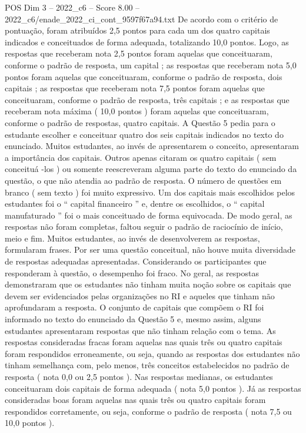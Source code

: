 \begin{textsample}{POS Dim 3 – 2022\_c6 – Score 8.00 – 2022\_c6/enade\_2022\_ci\_cont\_9597f67a94.txt}
De acordo com o critério de pontuação, foram atribuídos 2,5 pontos para cada um dos quatro capitais indicados e conceituados de forma adequada, totalizando 10,0 pontos.
Logo, as respostas que receberam nota 2,5 pontos foram aquelas que conceituaram, conforme o padrão de resposta, um capital ; as respostas que receberam nota 5,0 pontos foram aquelas que conceituaram, conforme o padrão de resposta, dois capitais ; as respostas que receberam nota 7,5 pontos foram aquelas que conceituaram, conforme o padrão de resposta, três capitais ; e as respostas que receberam nota máxima ( 10,0 pontos ) foram aquelas que conceituaram, conforme o padrão de respostas, quatro capitais.
A Questão 5 pedia para o estudante escolher e conceituar quatro dos seis capitais indicados no texto do enunciado.
Muitos estudantes, ao invés de apresentarem o conceito, apresentaram a importância dos capitais.
Outros apenas citaram os quatro capitais ( sem conceituá -los ) ou somente reescreveram alguma parte do texto do enunciado da questão, o que não atendia ao padrão de resposta.
O número de questões em branco ( sem texto ) foi muito expressivo.
Um dos capitais mais escolhidos pelos estudantes foi o “ capital financeiro ” e, dentre os escolhidos, o “ capital manufaturado ” foi o mais conceituado de forma equivocada.
De modo geral, as respostas não foram completas, faltou seguir o padrão de raciocínio de início, meio e fim.
Muitos estudantes, ao invés de desenvolverem as respostas, formularam frases.
Por ser uma questão conceitual, não houve muita diversidade de respostas adequadas apresentadas.
Considerando os participantes que responderam à questão, o desempenho foi fraco.
No geral, as respostas demonstraram que os estudantes não tinham muita noção sobre os capitais que devem ser evidenciados pelas organizações no RI e aqueles que tinham não aprofundaram a resposta.
O conjunto de capitais que compõem o RI foi informado no texto do enunciado da Questão 5 e, mesmo assim, alguns estudantes apresentaram respostas que não tinham relação com o tema.
As respostas consideradas fracas foram aquelas nas quais três ou quatro capitais foram respondidos erroneamente, ou seja, quando as respostas dos estudantes não tinham semelhança com, pelo menos, três conceitos estabelecidos no padrão de resposta ( nota 0,0 ou 2,5 pontos ).
Nas respostas medianas, os estudantes conceituaram dois capitais de forma adequada ( nota 5,0 pontos ).
Já as respostas consideradas boas foram aquelas nas quais três ou quatro capitais foram respondidos corretamente, ou seja, conforme o padrão de resposta ( nota 7,5 ou 10,0 pontos ).

\end{textsample}
